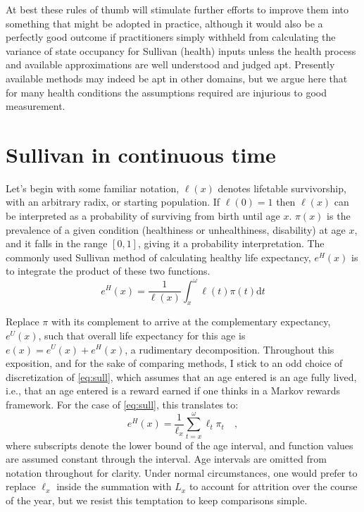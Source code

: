 \documentclass{bmcart}
\begin{document}
At best these rules of thumb will stimulate further efforts to improve them into something that might be adopted in practice, although it would also be a perfectly good outcome if practitioners simply withheld from calculating the variance of state occupancy for Sullivan (health) inputs unless the health process and available approximations are well understood and judged apt. Presently available methods may indeed be apt in other domains, but we argue here that for many health conditions the assumptions required are injurious to good measurement.



\section*{Sullivan in continuous time}
Let's begin with some familiar notation, $\ell(x)$ denotes lifetable survivorship, with an arbitrary radix, or starting population. If $\ell(0) = 1$ then $\ell(x)$ can be interpreted as a probability of surviving from birth until age $x$. $\pi(x)$ is the prevalence of a given condition (healthiness or unhealthiness, disability) at age $x$, and it falls in the range $[0,1]$, giving it a probability interpretation. The commonly used Sullivan method \citep{sullivan1971single} of calculating healthy life expectancy, $e^H(x)$ is to integrate the product of these two functions.
%
\begin{equation}
\label{eq:sull}
e^H(x) = \frac{1}{\ell(x)} \int_x^\omega \ell(t)\pi(t) \mathrm{d}t
\end{equation}
%

Replace $\pi$ with its complement to arrive at the complementary expectancy, $e^U(x)$, such that overall life expectancy for this age is $e(x) = e^U(x) + e^H(x)$, a rudimentary decomposition. Throughout this exposition, and for the sake of comparing methods, I stick to an odd choice of discretization of \ref{eq:sull}, which assumes that an age entered is an age fully lived, i.e., that an age entered is a reward earned if one thinks in a Markov rewards framework. For the case of \eqref{eq:sull}, this translates to:
\begin{equation}
\label{eq:sulldisc}
e^H(x) = \frac{1}{\ell_x} \sum_{t=x}^\omega \ell_t\pi_t \quad \mathrm{,}
\end{equation}
where subscripts denote the lower bound of the age interval, and function values are assumed constant through the interval. Age intervals are omitted from notation throughout for clarity. Under normal circumstances, one would prefer to replace $\ell_x$ inside the summation with $L_x$ to account for attrition over the course of the year, but we resist this temptation to keep comparisons simple.
\end{document}
